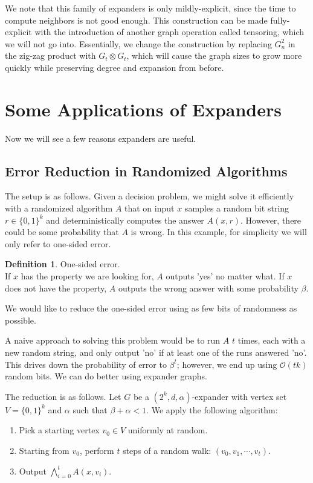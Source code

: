 \documentclass[11pt]{article}
\theoremstyle{definition}
\newtheorem{definition}[theorem]{Definition}
\theoremstyle{definition}
\theoremstyle{definition}
\newcommand{\mc}[1]
{\mathcal{#1}}
\begin{document}
We note that this family of expanders is only mildly-explicit, since the time to compute neighbors is not good enough. This construction can be made fully-explicit with the introduction of another graph operation called tensoring, which we will not go into. Essentially, we change the construction by replacing $G_n^2$ in the zig-zag product with $G_t \otimes G_t$, which will cause the graph sizes to grow more quickly while preserving degree and expansion from before. 

\section{Some Applications of Expanders}

Now we will see a few reasons expanders are useful.

\subsection{Error Reduction in Randomized Algorithms}

The setup is as follows. Given a decision problem, we might solve it efficiently with a randomized
algorithm $A$ that on input $x$ samples a random bit string $r \in \{0, 1\}^k$ and
deterministically computes the answer $A(x, r)$. However, there could be some probability
that $A$ is wrong. In this example, for simplicity we will only refer to one-sided error. 

\begin{definition} One-sided error. \\
If $x$ has the property we are looking for, $A$ outputs 'yes' no matter what.
If $x$ does not have the property, $A$ outputs the wrong answer with some probability $\beta$. 
\end{definition}
We would like to reduce the one-sided error using as few bits of randomness as possible.

A naive approach to solving this problem would be to run $A$ $t$ times, each with a new random string, and only output 'no' if at least one of the runs answered 'no'. This drives down the probability of error to $\beta^t$; however, we end up using $\mc{O}(tk)$ random bits. We can do better using expander graphs. 

The reduction is as follows. Let $G$ be a $(2^k, d, \alpha)$-expander with vertex set $V = \{0, 1\}^k$ and $\alpha$ such that $\beta + \alpha < 1$. We apply the following algorithm: 

\begin{enumerate}

\item Pick a starting vertex $v_0 \in V$ uniformly at random.

\item Starting from $v_0$, perform $t$ steps of a random walk: $(v_0, v_1, \cdots, v_t)$. 

\item Output $\bigwedge_{i = 0}^t A(x, v_i)$. 

\end{enumerate}
\end{document}
